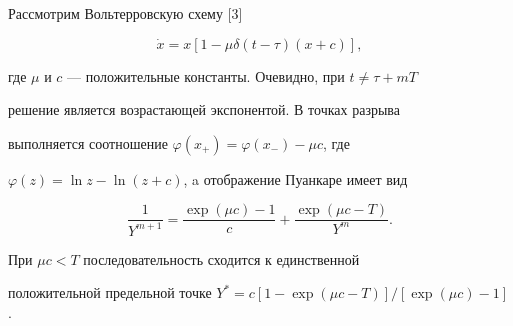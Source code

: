 \begin{exam} Рассмотрим Вольтерровскую схему [3]


$$


\Dot x=x[1-\mu\delta(t-\tau)(x+c)],


$$


где $\mu$ и $c$ --- положительные константы. Очевидно, при $t\ne\tau+mT$ 


решение является возрастающей экспонентой. В точках разрыва 


выполняется соотношение $\varphi(x_+)=\varphi(x_-)-\mu c$, где 


$\varphi(z)=\ln z-\ln(z+c)$, a отображение Пуанкаре имеет вид


\begin{equation}


\frac{1}{Y^{m+1}}=\frac{\exp(\mu c)-1}{c}+


\frac{\exp(\mu c-T)}{Y^m}.


\label{1.7}


\end{equation}


При $\mu c<T$ последовательность  сходится к единственной 


положительной предельной точке $Y^*=c[1-\exp(\mu c-T)]/[\exp(\mu 


c)-1]$.


\end{exam}





